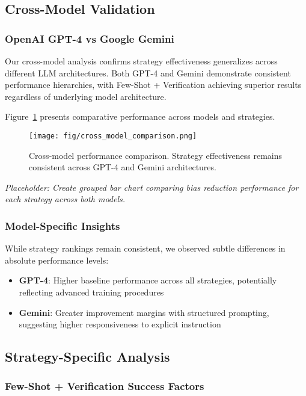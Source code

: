 \subsection{Cross-Model Validation}

\subsubsection{OpenAI GPT-4 vs Google Gemini}

Our cross-model analysis confirms strategy effectiveness generalizes across different LLM architectures. Both GPT-4 and Gemini demonstrate consistent performance hierarchies, with Few-Shot + Verification achieving superior results regardless of underlying model architecture.

Figure~\ref{fig:cross_model} presents comparative performance across models and strategies.

\begin{figure}[htbp]
\centerline{\texttt{[image: fig/cross\_model\_comparison.png]}}
\caption{Cross-model performance comparison. Strategy effectiveness remains consistent across GPT-4 and Gemini architectures.}
\label{fig:cross_model}
\end{figure}

\textit{Placeholder: Create grouped bar chart comparing bias reduction performance for each strategy across both models.}

\subsubsection{Model-Specific Insights}

While strategy rankings remain consistent, we observed subtle differences in absolute performance levels:
\begin{itemize}
    \item \textbf{GPT-4}: Higher baseline performance across all strategies, potentially reflecting advanced training procedures
    \item \textbf{Gemini}: Greater improvement margins with structured prompting, suggesting higher responsiveness to explicit instruction
\end{itemize}

\subsection{Strategy-Specific Analysis}

\subsubsection{Few-Shot + Verification Success Factors}

